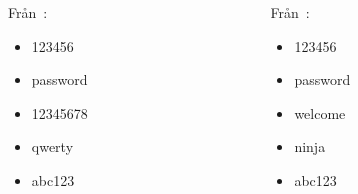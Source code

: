 \begin{frame}
  \begin{example}
    \begin{columns}
      \begin{column}{0.4\textwidth}
        \par
        Från~\cite{Oberheide2010bao}:
        \begin{itemize}
          \item 123456
          \item password
          \item 12345678
          \item qwerty
          \item abc123
        \end{itemize}
      \end{column}
      \begin{column}{0.4\textwidth}
        \par
        Från~\cite{Cluley2012twp}:
        \begin{itemize}
          \item 123456
          \item password
          \item welcome
          \item ninja
          \item abc123
        \end{itemize}
      \end{column}
    \end{columns}
  \end{example}
\end{frame}

